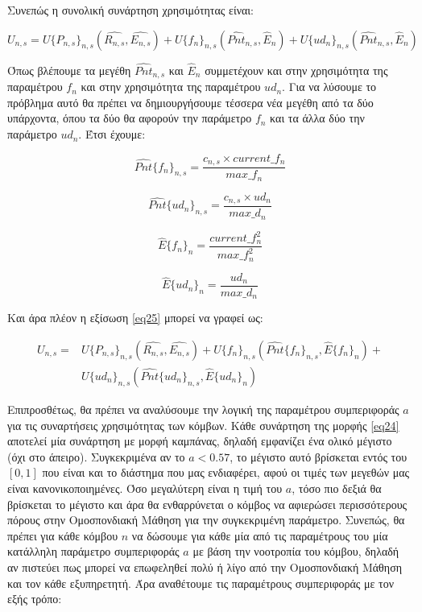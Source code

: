 Συνεπώς η συνολική συνάρτηση χρησιμότητας είναι:

\vspace{-0.6cm}

\begin{equation}
U_{n,s} =  U\{P_{n,s}\}_{n,s}(\hat{R_{n,s}}, \hat{E_{n,s}}) + U\{f_n\}_{n,s}(\hat{Pnt}_{n,s}, \hat{E}_n) + U\{ud_n\}_{n,s}(\hat{Pnt}_{n,s}, \hat{E}_n)
\label{eq25}
\end{equation}

\vspace{-3pt}

\noindent
Όπως βλέπουμε τα μεγέθη $\hat{Pnt}_{n,s}$ και $\hat{E}_n$ συμμετέχουν και στην χρησιμότητα της παραμέτρου $f_n$ και στην χρησιμότητα της παραμέτρου $ud_n$. Για να λύσουμε το πρόβλημα αυτό θα πρέπει να δημιουργήσουμε τέσσερα νέα μεγέθη από τα δύο υπάρχοντα, όπου τα δύο θα αφορούν την παράμετρο $f_n$ και τα άλλα δύο την παράμετρο $ud_n$. Έτσι έχουμε:

\[\hat{Pnt}\{f_n\}_{n,s}=\frac{c_{n,s}\times current\_f_n}{max\_f_n}\]

\[\hat{Pnt}\{ud_n\}_{n,s}=\frac{c_{n,s}\times ud_n}{max\_d_n}\]

\[\hat{E}\{f_n\}_n = \frac{current\_f_n^2}{max\_f_n^2}\]

\[\hat{E}\{ud_n\}_n = \frac{ud_n}{max\_d_n}\]

\noindent Και άρα πλέον η εξίσωση \ref{eq25} μπορεί να γραφεί ως:

\vspace{-0.6cm}

\begin{equation}
\begin{split}
    U_{n,s} =& U\{P_{n,s}\}_{n,s}(\hat{R_{n,s}}, \hat{E_{n,s}}) + U\{f_n\}_{n,s}(\hat{Pnt}\{f_n\}_{n,s}, \hat{E}\{f_n\}_n) +\\
    & U\{ud_n\}_{n,s}(\hat{Pnt}\{ud_n\}_{n,s}, \hat{E}\{ud_n\}_n)
\end{split}
\label{eq26}
\end{equation}

\vspace{-3pt}

Επιπροσθέτως, θα πρέπει να αναλύσουμε την λογική της παραμέτρου συμπεριφοράς $a$ για τις συναρτήσεις χρησιμότητας των κόμβων. Κάθε συνάρτηση της μορφής \ref{eq24} αποτελεί μία συνάρτηση με μορφή καμπάνας, δηλαδή εμφανίζει ένα ολικό μέγιστο (όχι στο άπειρο). Συγκεκριμένα αν το $a < 0.57$, το μέγιστο αυτό βρίσκεται εντός του $[0,1]$ που είναι και το διάστημα που μας ενδιαφέρει, αφού οι τιμές των μεγεθών μας είναι κανονικοποιημένες. Όσο μεγαλύτερη είναι η τιμή του $a$, τόσο πιο δεξιά θα βρίσκεται το μέγιστο και άρα θα ενθαρρύνεται ο κόμβος να αφιερώσει περισσότερους πόρους στην Ομοσπονδιακή Μάθηση για την συγκεκριμένη παράμετρο. Συνεπώς, θα πρέπει για κάθε κόμβου $n$ να δώσουμε για κάθε μία από τις παραμέτρους του μία κατάλληλη παράμετρο συμπεριφοράς $a$ με βάση την νοοτροπία του κόμβου, δηλαδή αν πιστεύει πως μπορεί να επωφεληθεί πολύ ή λίγο από την Ομοσπονδιακή Μάθηση και τον κάθε εξυπηρετητή. Άρα αναθέτουμε τις παραμέτρους συμπεριφοράς με τον εξής τρόπο:

